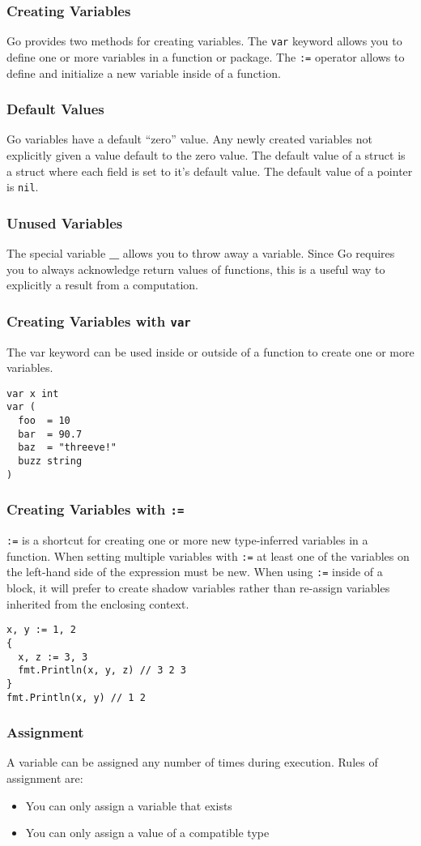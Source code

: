 \documentclass{beamer}
\begin{document}
\begin{frame}
  \frametitle{Creating Variables}
  Go provides two methods for creating variables.  The {\tt var}
  keyword allows you to define one or more variables in a function or
  package.  The {\tt :=} operator allows to define and initialize a
  new variable inside of a function.
\end{frame}

\begin{frame}
  \frametitle{Default Values}
  Go variables have a default ``zero'' value.  Any newly created
  variables not explicitly given a value default to the zero value.
  The default value of a struct is a struct where each field is set to
  it's default value.  The default value of a pointer is {\tt nil}.
\end{frame}

\begin{frame}
  \frametitle{Unused Variables}
  The special variable {\bf \_} allows you to throw away a variable.
  Since Go requires you to always acknowledge return values of
  functions, this is a useful way to explicitly a result from a
  computation.
\end{frame}

\begin{frame}[fragile]
  \frametitle{Creating Variables with {\tt var}}
  The var keyword can be used inside or outside of a function to
  create one or more variables.
\begin{lstlisting}[language=Golang]
var x int
var (
  foo  = 10
  bar  = 90.7
  baz  = "threeve!"
  buzz string
)
\end{lstlisting}
\end{frame}

\begin{frame}[fragile]
  \frametitle{Creating Variables with {\tt :=}}
  {\tt:=} is a shortcut for creating one or more new type-inferred
  variables in a function.  When setting multiple variables with
  {\tt:=} at least one of the variables on the left-hand side of the
  expression must be new.  When using {\tt :=} inside of a block, it
  will prefer to create shadow variables rather than re-assign
  variables inherited from the enclosing context.
\begin{lstlisting}[language=Golang]
x, y := 1, 2
{
  x, z := 3, 3
  fmt.Println(x, y, z) // 3 2 3
}
fmt.Println(x, y) // 1 2
\end{lstlisting}
\end{frame}

\begin{frame}
  \frametitle{Assignment}
  A variable can be assigned any number of times during execution.
  Rules of assignment are:
  \begin{itemize}
  \item You can only assign a variable that exists
  \item You can only assign a value of a compatible type
  \end{itemize}
\end{frame}
\end{document}
